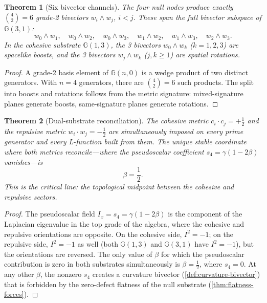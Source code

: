 \documentclass[11pt,a4paper]{article}
\theoremstyle{plain}
\newtheorem{theorem}{Theorem}[section]
\theoremstyle{definition}
\theoremstyle{remark}
\numberwithin{equation}{section}
\newcommand{\Cl}{\mathbb{G}}
\begin{document}
\begin{theorem}[Six bivector channels]
\label{thm:six-bivector-channels}
The four null nodes produce exactly \(\binom{4}{2}=6\)
grade-2 bivectors \(w_i\wedge w_j\), \(i<j\).  These span the full
bivector subspace of \(\Cl(3,1)\):
\[
  w_0\wedge w_1,\quad
  w_0\wedge w_2,\quad
  w_0\wedge w_3,\quad
  w_1\wedge w_2,\quad
  w_1\wedge w_3,\quad
  w_2\wedge w_3.
\]
In the cohesive substrate \(\Cl(1,3)\), the 3 bivectors
\(w_0\wedge w_k\) (\(k=1,2,3\)) are spacelike boosts, and the
3 bivectors \(w_j\wedge w_k\) (\(j,k\ge1\)) are spatial rotations.
\end{theorem}

\begin{proof}
A grade-2 basis element of \(\Cl(n,0)\) is a wedge product of two
distinct generators.  With \(n=4\) generators, there are
\(\binom42=6\) such products.  The split into boosts and rotations
follows from the metric signature: mixed-signature planes generate
boosts, same-signature planes generate rotations.
\end{proof}

\begin{theorem}[Dual-substrate reconciliation]
\label{thm:dual-reconciliation}
The cohesive metric \(c_i\cdot c_j=+\tfrac12\) and the repulsive
metric \(w_i\cdot w_j=-\tfrac12\) are simultaneously imposed on
every prime generator and every L-function built from them.  The
unique stable coordinate where both metrics reconcile---where the
pseudoscalar coefficient \(s_4=\gamma(1-2\beta)\) vanishes---is
\[
  \beta=\frac12.
\]
This is the critical line: the topological midpoint between the
cohesive and repulsive sectors.
\end{theorem}

\begin{proof}
The pseudoscalar field \(I_x=s_4=\gamma(1-2\beta)\) is the
component of the Laplacian eigenvalue in the top grade of the
algebra, where the cohesive and repulsive orientations are
opposite.  On the cohesive side, \(I^2=-1\); on the repulsive
side, \(I^2=-1\) as well (both \(\Cl(1,3)\) and \(\Cl(3,1)\)
have \(I^2=-1\)), but the orientations are reversed.  The only
value of \(\beta\) for which the pseudoscalar contribution is
zero in both substrates simultaneously is \(\beta=\tfrac12\),
where \(s_4=0\).  At any other \(\beta\), the nonzero \(s_4\)
creates a curvature bivector (\cref{def:curvature-bivector})
that is forbidden by the zero-defect flatness of the null
substrate (\cref{thm:flatness-forces}).
\end{proof}
\end{document}
